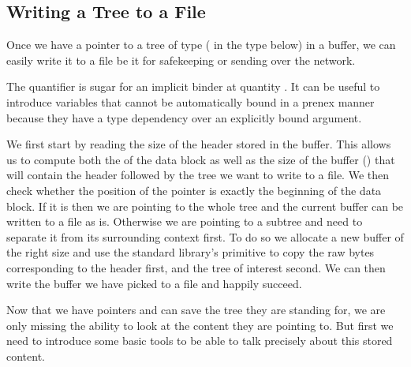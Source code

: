 \subsection{Writing a Tree to a File}\label{sec:writetofile}

Once we have a pointer to a tree  of type 
(   in the type below)
in a buffer, we can easily write it to a file be it for safekeeping
or sending over the network.



\begin{remark}
  The  quantifier is sugar for an implicit
  binder at quantity .
  It can be useful to introduce variables that cannot be automatically
  bound in a prenex manner because they have a type dependency over an
  explicitly bound argument.
\end{remark}


We first start by reading the size of the header stored in the buffer.
%
This allows us to compute both the  of the data block
as well as the size of the buffer () that will
contain the header followed by the tree we want to write to a file.
%
We then check whether the position of the pointer is exactly the beginning
of the data block.
%
If it is then we are pointing to the whole tree and the current buffer can
be written to a file as is.
%
Otherwise we are pointing to a subtree and need to separate it from its
surrounding context first.
%
To do so we allocate a new buffer of the right size and use the
standard library's  primitive to copy the raw bytes
corresponding to the header first, and the tree of interest second.
%
We can then write the buffer we have picked to a file and happily succeed.



Now that we have pointers and can save the tree they are standing for,
we are only missing the ability to look at the content they are pointing to.
%
But first we need to introduce some basic tools
to be able to talk precisely about this stored content.
